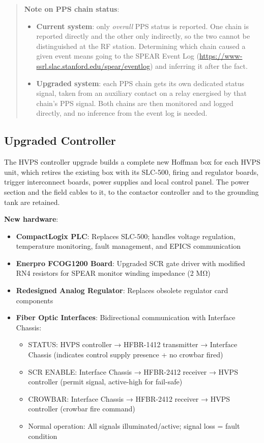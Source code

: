 \begin{quote}
\textbf{Note on PPS chain status}:

\begin{itemize}
\tightlist
\item
  \textbf{Current system}: only \emph{overall} PPS status is reported. One chain is reported directly and the other only indirectly, so the two cannot be distinguished at the RF station. Determining which chain caused a given event means going to the SPEAR Event Log (\url{https://www-ssrl.slac.stanford.edu/spear/eventlog}) and inferring it after the fact.
\item
  \textbf{Upgraded system}: each PPS chain gets its own dedicated status signal, taken from an auxiliary contact on a relay energised by that chain's PPS signal. Both chains are then monitored and logged directly, and no inference from the event log is needed.
\end{itemize}
\end{quote}

\subsection{Upgraded Controller}\label{upgraded-controller}

The HVPS controller upgrade builds a complete new Hoffman box for each HVPS unit, which retires the existing box with its SLC-500, firing and regulator boards, trigger interconnect boards, power supplies and local control panel. The power section and the field cables to it, to the contactor controller and to the grounding tank are retained.

\textbf{New hardware}:

\begin{itemize}
\tightlist
\item
  \textbf{CompactLogix PLC}: Replaces SLC-500; handles voltage regulation, temperature monitoring, fault management, and EPICS communication
\item
  \textbf{Enerpro FCOG1200 Board}: Upgraded SCR gate driver with modified RN4 resistors for SPEAR monitor winding impedance (2 MΩ)
\item
  \textbf{Redesigned Analog Regulator}: Replaces obsolete regulator card components
\item
  \textbf{Fiber Optic Interfaces}: Bidirectional communication with Interface Chassis:

  \begin{itemize}
  \tightlist
  \item
    STATUS: HVPS controller → HFBR-1412 transmitter → Interface Chassis (indicates control supply presence + no crowbar fired)
  \item
    SCR ENABLE: Interface Chassis → HFBR-2412 receiver → HVPS controller (permit signal, active-high for fail-safe)
  \item
    CROWBAR: Interface Chassis → HFBR-2412 receiver → HVPS controller (crowbar fire command)
  \item
    Normal operation: All signals illuminated/active; signal loss = fault condition
  \end{itemize}
\end{itemize}

